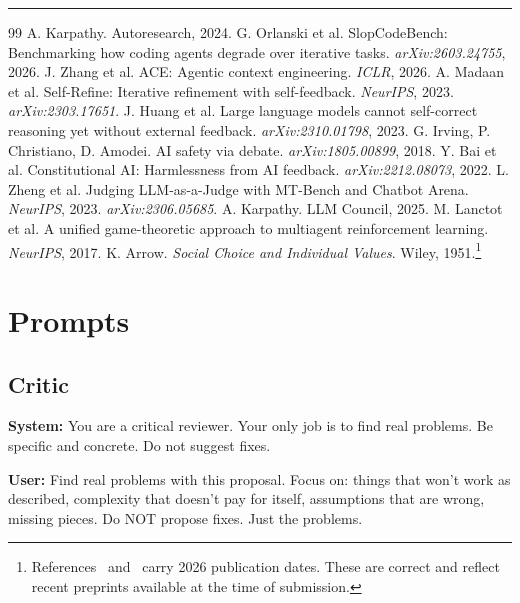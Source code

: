 \documentclass[10pt,twocolumn]{article}
\begin{document}
\vspace{4pt}
\hrule
\vspace{6pt}

\begin{thebibliography}{99}
\small
{} A. Karpathy. Autoresearch, 2024.
 G. Orlanski et al. SlopCodeBench: Benchmarking how coding agents degrade over iterative tasks. \textit{arXiv:2603.24755}, 2026.
 J. Zhang et al. ACE: Agentic context engineering. \textit{ICLR}, 2026.
 A. Madaan et al. Self-Refine: Iterative refinement with self-feedback. \textit{NeurIPS}, 2023. \textit{arXiv:2303.17651}.
 J. Huang et al. Large language models cannot self-correct reasoning yet without external feedback. \textit{arXiv:2310.01798}, 2023.
 G. Irving, P. Christiano, D. Amodei. AI safety via debate. \textit{arXiv:1805.00899}, 2018.
 Y. Bai et al. Constitutional AI: Harmlessness from AI feedback. \textit{arXiv:2212.08073}, 2022.
 L. Zheng et al. Judging LLM-as-a-Judge with MT-Bench and Chatbot Arena. \textit{NeurIPS}, 2023. \textit{arXiv:2306.05685}.
 A. Karpathy. LLM Council, 2025.
 M. Lanctot et al. A unified game-theoretic approach to multiagent reinforcement learning. \textit{NeurIPS}, 2017.
 K. Arrow. \textit{Social Choice and Individual Values}. Wiley, 1951.\footnote{References~\cite{slopcodebench} and~\cite{ace} carry 2026 publication dates. These are correct and reflect recent preprints available at the time of submission.}
\end{thebibliography}

\onecolumn
\appendix

\section{Prompts}
\label{app:prompts}

\subsection{Critic}
\begin{tcolorbox}[promptbox]
\textbf{System:} You are a critical reviewer. Your only job is to find real problems. Be specific and concrete. Do not suggest fixes.

\textbf{User:} Find real problems with this proposal. Focus on: things that won't work as described, complexity that doesn't pay for itself, assumptions that are wrong, missing pieces. Do NOT propose fixes. Just the problems.
\end{tcolorbox}
\end{document}
